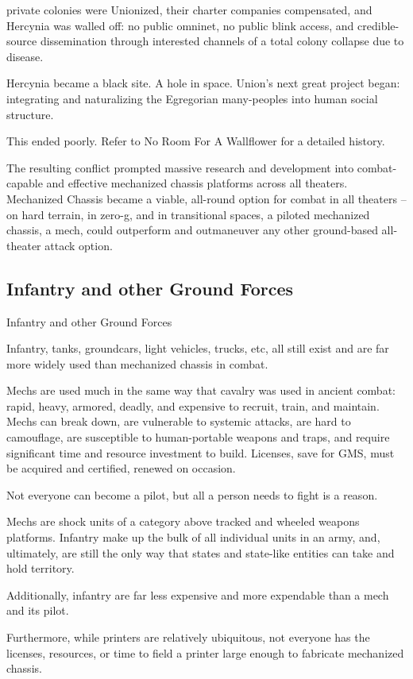 private colonies were Unionized, their charter companies compensated, and Hercynia was
walled off: no public omninet, no public blink access, and credible-source dissemination through
interested channels of a total colony collapse due to disease.


Hercynia became a black site. A hole in space. Union’s next great project began: integrating and
naturalizing the Egregorian many-peoples into human social structure.


This ended poorly. Refer to No Room For A Wallflower for a detailed history.


The resulting conflict prompted massive research and development into combat-capable and
effective mechanized chassis platforms across all theaters. Mechanized Chassis became a
viable, all-round option for combat in all theaters -- on hard terrain, in zero-g, and in transitional
spaces, a piloted mechanized chassis, a mech, could outperform and outmaneuver any other
ground-based all-theater attack option.

\subsection{Infantry and other Ground Forces}
Infantry and other Ground Forces

Infantry, tanks, groundcars, light vehicles, trucks, etc, all still exist and are far more widely used
than mechanized chassis in combat.


Mechs are used much in the same way that cavalry was used in ancient combat: rapid, heavy,
armored, deadly, and expensive to recruit, train, and maintain. Mechs can break down, are
vulnerable to systemic attacks, are hard to camouflage, are susceptible to human-portable
weapons and traps, and require significant time and resource investment to build. Licenses, save
for GMS, must be acquired and certified, renewed on occasion.


Not everyone can become a pilot, but all a person needs to fight is a reason.


Mechs are shock units of a category above tracked and wheeled weapons platforms. Infantry
make up the bulk of all individual units in an army, and, ultimately, are still the only way that
states and state-like entities can take and hold territory.


Additionally, infantry are far less expensive and more expendable than a mech and its pilot.


Furthermore, while printers are relatively ubiquitous, not everyone has the licenses, resources, or
time to field a printer large enough to fabricate mechanized chassis.


